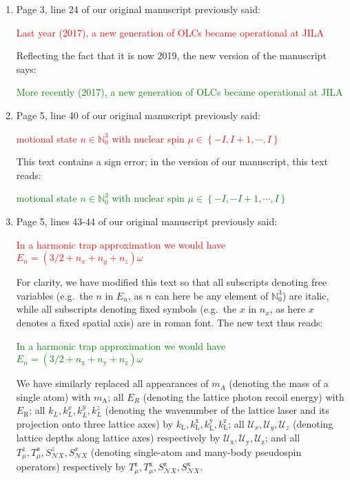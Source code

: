 \documentclass[preprint]{revtex4-1}
\renewcommand{\t}{\text} %
\newcommand{\p}[1]{\left(#1\right)} %
\renewcommand{\set}[1]{\left\{#1\right\}} %
\newcommand{\x}{\text{x}}
\newcommand{\y}{\text{y}}
\newcommand{\z}{\text{z}}
\newcommand{\N}{\mathcal{N}}
\newcommand{\U}{\mathcal{U}}
\newcommand{\1}{\mathds{1}}
\newcommand{\red}[1]{\textcolor{red}{#1}}
\newcommand{\green}[1]{\textcolor{green}{#1}}
\begin{document}
\begin{enumerate}[label=(R3.\arabic*)]
\item Page 3, line 24 of our original manuscript previously said:

  \red{Last year (2017), a new generation of OLCs became operational
    at JILA}

  Reflecting the fact that it is now 2019, the new version of the
  manuscript says:

  \green{More recently (2017), a new generation of OLCs became
    operational at JILA}


\item Page 5, line 40 of our original manuscript previously said:

  \red{motional state $n\in\mathbb{N}_0^3$ with nuclear spin
    $\mu\in\set{-I,I+1,\cdots,I}$}

  This text contains a sign error; in the version of our manuscript,
  this text reads:

  \green{motional state $n\in\mathbb{N}_0^3$ with nuclear spin
    $\mu\in\set{-I,-I+1,\cdots,I}$}


\item Page 5, lines 43-44 of our original manuscript previously said:

  \red{In a harmonic trap approximation we would have
    $E_n=\p{3/2+n_x+n_y+n_z}\omega$}

  For clarity, we have modified this text so that all subscripts
  denoting free variables (e.g.~the $n$ in $E_n$, as $n$ can here be
  any element of $\mathbb{N}_0^3$) are italic, while all subscripts
  denoting fixed symbols (e.g.~the $x$ in $n_x$, as here $x$ denotes a
  fixed spatial axis) are in roman font.  The new text thus reads:

  \green{In a harmonic trap approximation we would have
    $E_n=\p{3/2+n_\x+n_\y+n_\z}\omega$}

  We have similarly replaced all appearances of $m_A$ (denoting the
  mass of a single atom) with $m_{\text{A}}$; all $E_R$ (denoting the
  lattice photon recoil energy) with $E_{\t{R}}$; all
  $k_L,k_L^x,k_L^y,k_L^z$ (denoting the wavenumber of the lattice
  laser and its projection onto three lattice axes) by
  $k_{\text{L}}, k_{\text{L}}^\x, k_{\text{L}}^\y, k_{\text{L}}^\z$;
  all $\U_x,\U_y,\U_z$ (denoting lattice depths along lattice axes)
  respectively by $\U_\x,\U_\y,\U_\z$; and all
  $T_\mu^z,T_\mu^x,S_{\N X}^z,S_{\N X}^x$ (denoting single-atom and
  many-body pseudospin operators) respectively by
  $T_\mu^\z,T_\mu^\x,S_{\N X}^\z,S_{\N X}^\x$.


\end{enumerate}
\end{document}
